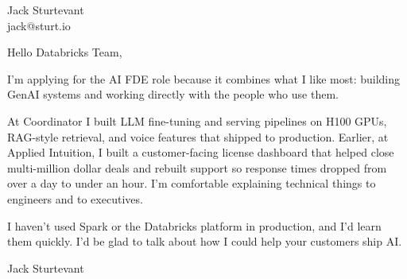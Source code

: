 \documentclass[11pt]{article}
\begin{document}
\raggedright

{\namefont\fontsize{20pt}{24pt}\selectfont Jack Sturtevant}\\[-0.3em]
jack@sturt.io

\vspace{1.2em}

Hello Databricks Team,

I'm applying for the AI FDE role because it combines what I like most: building GenAI systems and working directly with the people who use them.

At Coordinator I built LLM fine-tuning and serving pipelines on H100 GPUs, RAG-style retrieval, and voice features that shipped to production. Earlier, at Applied Intuition, I built a customer-facing license dashboard that helped close multi-million dollar deals and rebuilt support so response times dropped from over a day to under an hour. I'm comfortable explaining technical things to engineers and to executives.

I haven't used Spark or the Databricks platform in production, and I'd learn them quickly. I'd be glad to talk about how I could help your customers ship AI.

\vspace{0.6em}
Jack Sturtevant
\end{document}
